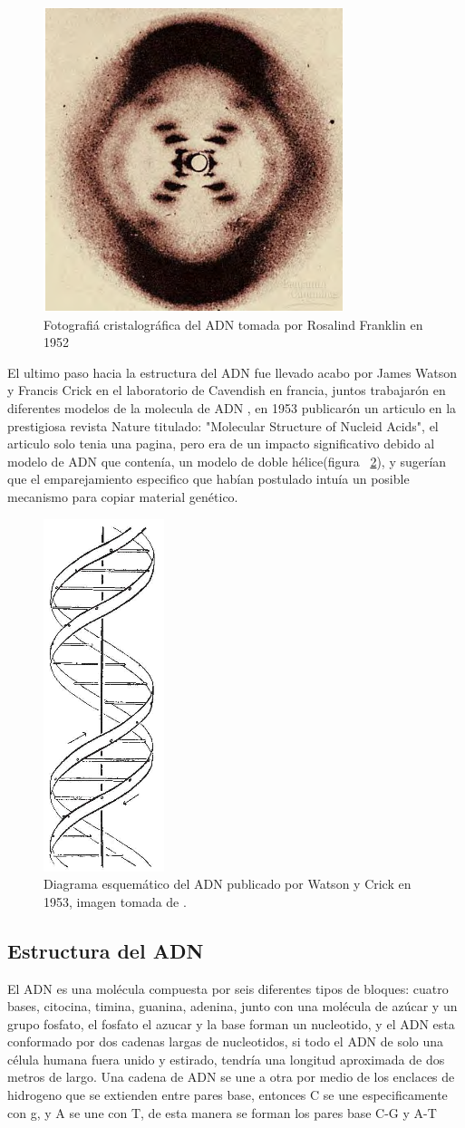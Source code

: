 \begin{figure}[htbp]
    \centering
    \includegraphics[width=0.5\linewidth]{./Figures/RF.png}
    \caption[Fotografía cristalográfica del ADN]{Fotografiá cristalográfica del ADN tomada por Rosalind Franklin en 1952}
    \label{fig:rf}
\end{figure}
El ultimo paso hacia la estructura del ADN fue llevado acabo por James Watson y Francis Crick en el laboratorio de Cavendish en francia, juntos trabajarón en diferentes modelos de la molecula de ADN , en 1953 publicarón un articulo en la prestigiosa revista Nature titulado: "Molecular Structure of Nucleid Acids", el articulo solo tenia una pagina, pero era de un impacto significativo debido al modelo de ADN que contenía, un modelo de doble hélice(figura ~\ref{fig:jw}), y sugerían que el emparejamiento  especifico que habían postulado intuía un posible mecanismo para copiar material genético.
\begin{figure}[htbp]
    \centering
    \includegraphics[width=0.15\linewidth]{./Figures/DNA1.png}
    \caption[Diagrama esquemático del ADN]{Diagrama esquemático del ADN publicado por Watson y Crick en 1953, imagen tomada de \cite{jwfc}.}
    \label{fig:jw}
\end{figure}
\subsection{Estructura del ADN}
El ADN es una molécula compuesta por seis diferentes tipos de bloques: cuatro bases, citocina, timina, guanina, adenina, junto con una molécula de azúcar y un grupo fosfato, el fosfato el azucar y la base forman un nucleotido, y el ADN esta conformado por dos cadenas largas de nucleotidos, si todo el ADN de solo una célula humana fuera unido y estirado, tendría una longitud aproximada de dos metros de largo. Una cadena de ADN se une a otra por medio de los enclaces de hidrogeno que se extienden entre pares base, entonces C se une especificamente con g, y A se une con T, de esta manera se forman los pares base C-G y A-T


